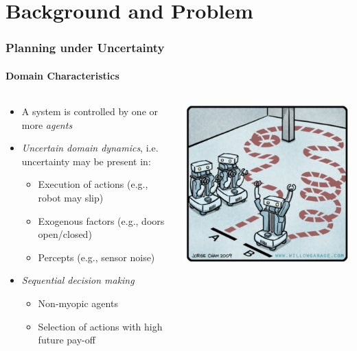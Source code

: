 \section{Background and Problem}

\begin{frame}
	\frametitle{Planning under Uncertainty}
	\framesubtitle{Domain Characteristics}
	
	\begin{columns}[T]
		\begin{column}{.7\textwidth}
			\begin{itemize}
				\item A system is controlled by one or more \textit{agents}
				\item \textit{Uncertain domain dynamics}, i.e.\\ uncertainty may be present in:
				\begin{itemize}
					\item Execution of actions (e.g., robot may slip)
					\item Exogenous factors (e.g., doors open/closed)
					\item Percepts (e.g., sensor noise)
				\end{itemize}
				\item \textit{Sequential decision making}
				\begin{itemize}
					\item Non-myopic agents
					\item Selection of actions with high future pay-off
				\end{itemize}
			\end{itemize}
		\end{column}
		\begin{column}{.35\textwidth}
			\includegraphics[width=1.0\textwidth, right]{figures/path-planning2}
		\end{column}
	\end{columns}
\end{frame}

